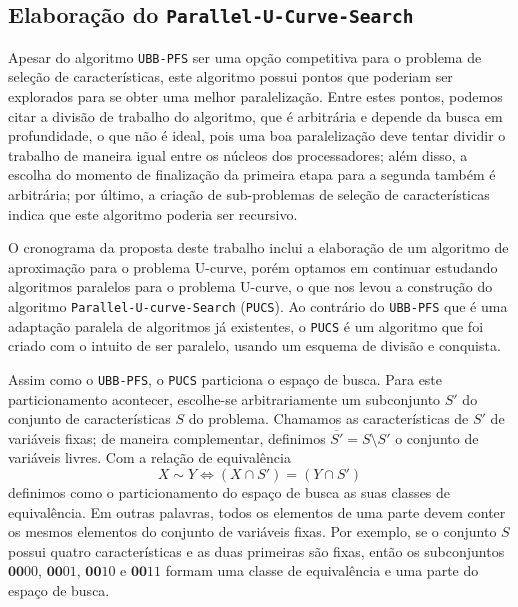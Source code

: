 \documentclass[12pt]{article}
\newcommand{\algname}[1]{\texttt{#1}}
\begin{document}
\subsection{Elaboração do \algname{Parallel-U-Curve-Search}}
Apesar do algoritmo \algname{UBB-PFS} ser uma opção competitiva para o
problema de seleção de características, este algoritmo possui pontos
que poderiam ser explorados para se obter uma melhor paralelização. 
Entre estes pontos, podemos citar a divisão de trabalho do algoritmo,
que é arbitrária e depende da busca em profundidade, 
o que não é ideal, pois uma boa paralelização deve tentar dividir o 
trabalho de maneira igual entre os núcleos dos processadores; além 
disso, a escolha do momento de finalização da primeira etapa para a 
segunda também é arbitrária; por último, a criação de sub-problemas de
seleção de características indica que este algoritmo poderia ser
recursivo.

O cronograma da proposta deste trabalho inclui a elaboração de um 
algoritmo de aproximação para o problema U-curve, porém optamos em 
continuar estudando algoritmos paralelos para o problema U-curve, o que 
nos levou a construção do algoritmo 
\algname{Parallel\--U-curve\--Search} (\algname{PUCS}). Ao contrário do
\algname{UBB-PFS} que é uma adaptação paralela de algoritmos já 
existentes, o \algname{PUCS} é um algoritmo que foi criado com o intuito
de ser paralelo, usando um esquema de divisão e conquista.

Assim como o \algname{UBB-PFS}, o \algname{PUCS} particiona o espaço de
busca. Para este particionamento acontecer, escolhe-se arbitrariamente
um subconjunto $S'$ do conjunto de características $S$ do problema. 
Chamamos as características de $S'$ de variáveis fixas; de maneira 
complementar, definimos $\overline{S'} = S \setminus S'$ o conjunto de
variáveis livres. Com a relação
de equivalência
\begin{equation}
    X \sim Y \iff (X \cap S')  = (Y \cap S') \nonumber
\end{equation}
definimos como o particionamento do espaço de busca as suas classes de
equivalência. Em outras palavras, todos os elementos de uma parte
devem conter os mesmos elementos do conjunto de variáveis fixas. Por
exemplo, se o conjunto $S$ possui quatro características e as duas
primeiras são fixas, então os subconjuntos $\mathbf{00}00$, 
$\mathbf{00}01$, $\mathbf{00}10$ e $\mathbf{00}11$ formam uma classe de 
equivalência e uma parte do espaço de busca.
\end{document}

